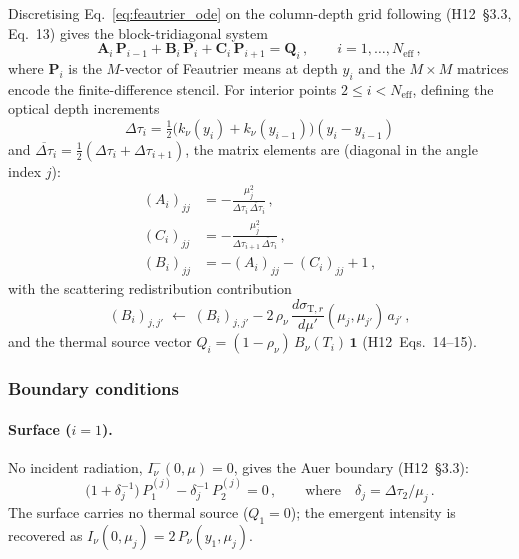 Discretising Eq.~\eqref{eq:feautrier_ode} on the column-depth grid following \citet{auer1976} (H12~\S3.3, Eq.~13) gives the block-tridiagonal system
\begin{equation}
  \mathbf{A}_i\,\mathbf{P}_{i-1}
  + \mathbf{B}_i\,\mathbf{P}_{i}
  + \mathbf{C}_i\,\mathbf{P}_{i+1}
  = \mathbf{Q}_i\,,
  \qquad i=1,\dots,N_\mathrm{eff}\,,
  \label{eq:block_tridiag}
\end{equation}
where $\mathbf{P}_i$ is the $M$-vector of Feautrier means at depth $y_i$ and the $M\!\times\!M$ matrices encode the finite-difference stencil. For interior points $2\le i < N_\mathrm{eff}$, defining the optical depth increments
\begin{equation}
  \Delta\tau_i = \tfrac{1}{2}\bigl(k_\nu(y_i)+k_\nu(y_{i-1})\bigr)(y_i - y_{i-1})
\end{equation}
and $\overline{\Delta\tau}_i = \frac{1}{2}(\Delta\tau_i + \Delta\tau_{i+1})$, the matrix elements are (diagonal in the angle index $j$):
\begin{align}
  (A_i)_{jj} &= -\frac{\mu_j^2}{\Delta\tau_i\,\overline{\Delta\tau}_i}\,, \\[4pt]
  (C_i)_{jj} &= -\frac{\mu_j^2}{\Delta\tau_{i+1}\,\overline{\Delta\tau}_i}\,, \\[4pt]
  (B_i)_{jj} &= -\!(A_i)_{jj} - (C_i)_{jj} + 1\,,
\end{align}
with the scattering redistribution contribution
\begin{equation}
  (B_i)_{j,j'} \;\longleftarrow\; (B_i)_{j,j'}
  - 2\,\rho_\nu\,\frac{d\sigma_{\mathrm{T},r}}{d\mu'}(\mu_j,\mu_{j'})\,a_{j'}\,,
  \label{eq:scattering_matrix}
\end{equation}
and the thermal source vector $Q_i = (1-\rho_\nu)\,B_\nu(T_i)\,\mathbf{1}$ (H12~Eqs.~14--15).

\subsubsection{Boundary conditions}

\paragraph{Surface ($i=1$).}
No incident radiation, $I_{\nu}^{-}(0,\mu)=0$, gives the Auer boundary (H12~\S3.3):
\begin{equation}
  \bigl(1 + \delta_j^{-1}\bigr)\,P_1^{(j)} - \delta_j^{-1}\,P_2^{(j)} = 0\,,
  \qquad\text{where}\quad \delta_j = \Delta\tau_2/\mu_j\,.
  \label{eq:surface_bc}
\end{equation}
The surface carries no thermal source ($Q_1=0$); the emergent intensity is recovered as $I_\nu(0,\mu_j)=2\,P_\nu(y_1,\mu_j)$.

